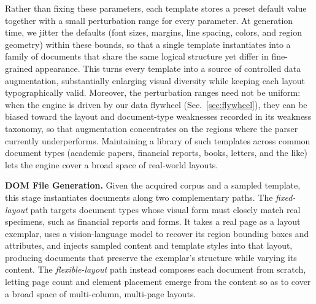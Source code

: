 Rather than fixing these parameters, each template stores a preset default value together with a small perturbation range for every parameter. At generation time, we jitter the defaults (font sizes, margins, line spacing, colors, and region geometry) within these bounds, so that a single template instantiates into a family of documents that share the same logical structure yet differ in fine-grained appearance. This turns every template into a source of controlled data augmentation, substantially enlarging visual diversity while keeping each layout typographically valid. Moreover, the perturbation ranges need not be uniform: when the engine is driven by our data flywheel (Sec.~\ref{sec:flywheel}), they can be biased toward the layout and document-type weaknesses recorded in its weakness taxonomy, so that augmentation concentrates on the regions where the parser currently underperforms. Maintaining a library of such templates across common document types (academic papers, financial reports, books, letters, and the like) lets the engine cover a broad space of real-world layouts.

\textbf{DOM File Generation.} Given the acquired corpus and a sampled template, this stage instantiates documents along two complementary paths. The \emph{fixed-layout} path targets document types whose visual form must closely match real specimens, such as financial reports and forms. It takes a real page as a layout exemplar, uses a vision-language model to recover its region bounding boxes and attributes, and injects sampled content and template styles into that layout, producing documents that preserve the exemplar's structure while varying its content. The \emph{flexible-layout} path instead composes each document from scratch, letting page count and element placement emerge from the content so as to cover a broad space of multi-column, multi-page layouts.

